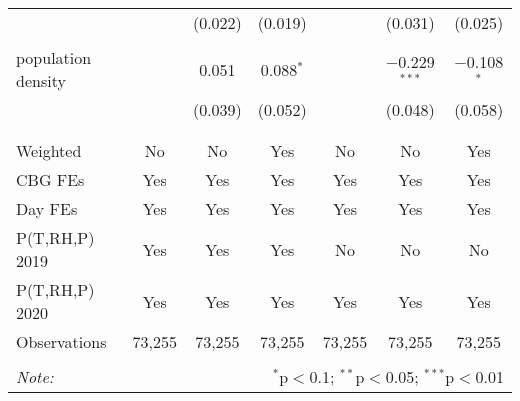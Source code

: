 \begin{table}[!htbp]
\begin{tabular}{@{\extracolsep{5pt}}lcccccc}
  &  & (0.022) & (0.019) &  & (0.031) & (0.025) \\ 
  & & & & & & \\ 
 population density &  & 0.051 & 0.088$^{*}$ &  & $-$0.229$^{***}$ & $-$0.108$^{*}$ \\ 
  &  & (0.039) & (0.052) &  & (0.048) & (0.058) \\ 
  & & & & & & \\ 
\hline \\[-1.8ex] 
Weighted & No & No & Yes & No & No & Yes \\ 
CBG FEs & Yes & Yes & Yes & Yes & Yes & Yes \\ 
Day FEs & Yes & Yes & Yes & Yes & Yes & Yes \\ 
P(T,RH,P) 2019 & Yes & Yes & Yes & No & No & No \\ 
P(T,RH,P) 2020 & Yes & Yes & Yes & Yes & Yes & Yes \\ 
Observations & 73,255 & 73,255 & 73,255 & 73,255 & 73,255 & 73,255 \\ 
\hline 
\hline \\[-1.8ex] 
\textit{Note:}  & \multicolumn{6}{r}{$^{*}$p$<$0.1; $^{**}$p$<$0.05; $^{***}$p$<$0.01} \\ 
\end{tabular} 
\end{table} 
